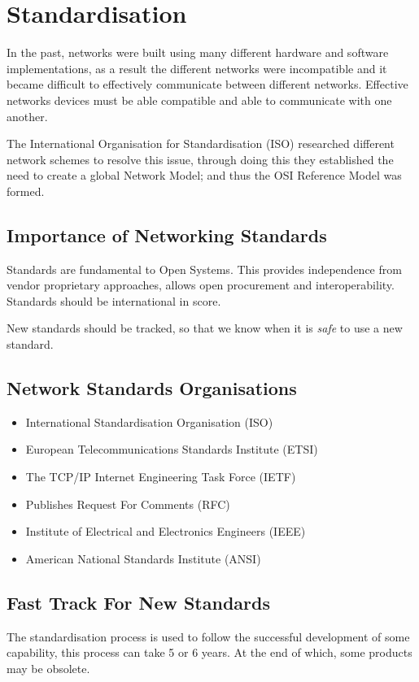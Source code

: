 
\section*{Standardisation}
In the past, networks were built using many different hardware and software implementations, as a result the different networks were incompatible and it became difficult to effectively communicate between different networks. Effective networks devices must be able compatible and able to communicate with one another.

The International Organisation for Standardisation (ISO) researched different network schemes to resolve this issue, through doing this they established the need to create a global Network Model; and thus the OSI Reference Model was formed.

\subsection*{Importance of Networking Standards}
Standards are fundamental to Open Systems. This provides independence from vendor proprietary approaches, allows open procurement and interoperability. Standards should be international in score.

New standards should be tracked, so that we know when it is \textit{safe} to use a new standard.
\subsection*{Network Standards Organisations}
\begin{itemize}
    \item International Standardisation Organisation (ISO)
    \item European Telecommunications Standards Institute (ETSI)
    \item The TCP/IP Internet Engineering Task Force (IETF)
    \item Publishes Request For Comments (RFC)
    \item Institute of Electrical and Electronics Engineers (IEEE)
    \item American National Standards Institute (ANSI)
\end{itemize}

\subsection*{Fast Track For New Standards}
The standardisation process is used to follow the successful development of some capability, this process can take 5 or 6 years. At the end of which, some products may be obsolete.


